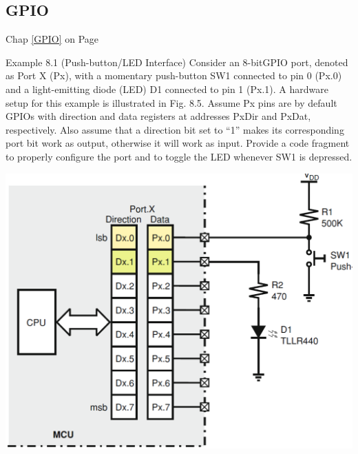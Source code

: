 \subsection*{GPIO}
Chap \ref{GPIO} on Page \pageref{GPIO}\\
\begin{minipage}{0.5\linewidth}
    Example 8.1 (Push-button/LED Interface) Consider an 8-bitGPIO port, denoted
    as Port X (Px), with a momentary push-button SW1 connected to pin 0 (Px.0) and a
    light-emitting diode (LED) D1 connected to pin 1 (Px.1). A hardware setup for this
    example is illustrated in Fig. 8.5. Assume Px pins are by default GPIOs with direction
    and data registers at addresses PxDir and PxDat, respectively. Also assume that a
    direction bit set to “1” makes its corresponding port bit work as output, otherwise
    it will work as input. Provide a code fragment to properly configure the port and to
    toggle the LED whenever SW1 is depressed.
\end{minipage}
\begin{minipage}{0.5\linewidth}
    \includegraphics[width=\linewidth]{images/GPIOBsp}
\end{minipage}



\clearpage